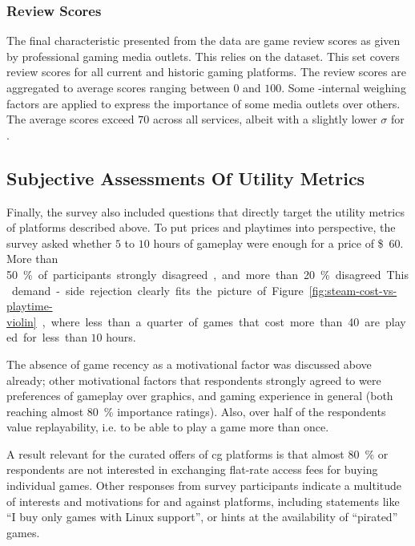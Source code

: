 \subsubsection{Review Scores}

The final characteristic presented from the data are game review scores as
given by professional gaming media outlets. This relies on the
\metacritic dataset. This set covers review scores for all current
and historic gaming platforms. The review scores are aggregated to
average scores ranging between $0$ and $100$. Some \metacritic-internal
weighing factors are applied to express the importance of some media
outlets over others.
The average scores exceed $70$ across all services, albeit with a
slightly lower $\sigma$ for \gfnow.



\subsection{Subjective Assessments Of Utility Metrics}

Finally, the survey also included questions that directly target
the utility metrics of platforms described above.
To put prices and playtimes into perspective, the survey asked
whether $5$ to $10$ hours of gameplay were enough for a price of \SI{60}[\$]{}.
More than \SI{50}\% of participants strongly disagreed, and more than
\SI{20}{\percent} disagreed. This demand-side rejection clearly fits the picture of
Figure~\ref{fig:steam-cost-vs-playtime-violin}, where less than a
quarter of games that cost more than \SI{40}[\EUR]{} are played for less than
$10$ hours.

The absence of game recency as a motivational factor was discussed
above already; other motivational factors that respondents strongly
agreed to were preferences of gameplay over graphics, and gaming
experience in general (both reaching almost \SI{80}{\percent} importance ratings).
Also, over half of the respondents value replayability, i.e. to
be able to play a game more than once.

A result relevant for the curated offers of \gls{cg}
platforms is that almost \SI{80}{\percent} or respondents are not interested in
exchanging flat-rate access fees for buying individual games.
Other responses from survey participants indicate a multitude of
interests and motivations for and against platforms, including
statements like ``I buy only games with Linux support'',
or hints at the availability of ``pirated'' games.
